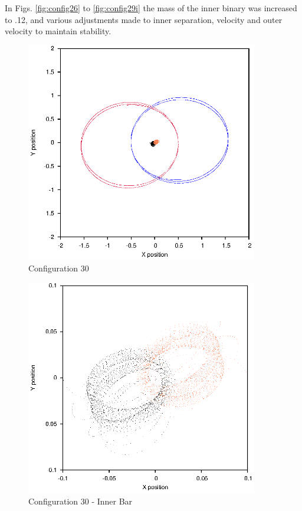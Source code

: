 \documentclass[a4paper,12pt]{article}
\begin{document}
In Figs. \ref{fig:config26} to \ref{fig:config29i} the mass of the inner binary was increased to .12, and various adjustments made to inner separation, velocity and outer velocity to maintain stability.

\begin{figure}[H]
\centering
\includegraphics[width=0.9\textwidth]{./2017results/1-1-1-1/Orbit.eps}
\caption{Configuration 30}
\label{fig:config30}
\end{figure}
\begin{figure}[H]
\centering
\includegraphics[width=0.9\textwidth]{./2017results/1-1-1-1/Inner.eps}
\caption{Configuration 30 - Inner Bar}
\label{fig:config30i}
\end{figure}
\end{document}
